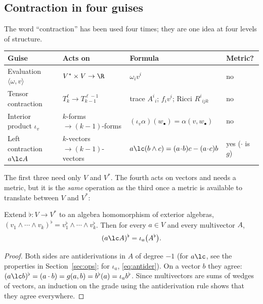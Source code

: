 \subsection{Contraction in four guises}\label{sec:contr4}

The word ``contraction'' has been used four times; they are one idea at four levels of structure.

\begin{center}
\small
\renewcommand{\arraystretch}{1.35}
\begin{tabular}{@{}p{3.4cm}p{3.5cm}p{4.2cm}p{2.2cm}@{}}
\toprule
\textbf{Guise} & \textbf{Acts on} & \textbf{Formula} & \textbf{Metric?}\\
\midrule
Evaluation $\langle\omega,v\rangle$ & $V^*\times V\to\R$ & $\omega_iv^i$ & no\\
Tensor contraction & $T^{\ell}_{k}\to T^{\ell-1}_{k-1}$ & trace $A^i{}_i$; $f_iv^i$; Ricci $R^i{}_{ijk}$ & no\\
Interior product $\iota_v$ & $k$-forms $\to(k-1)$-forms & $(\iota_v\alpha)(w_\bullet)=\alpha(v,w_\bullet)$ & no\\
Left contraction $a\lc A$ & $k$-vectors $\to(k-1)$-vectors & $a\lc(b\wedge c)=(a\!\cdot\! b)c-(a\!\cdot\! c)b$ & yes ($\cdot$ is $g$)\\
\bottomrule
\end{tabular}
\end{center}

The first three need only $V$ and $V^*$. The fourth acts on vectors and needs a metric, but it is the \emph{same} operation as the third once a
metric is available to translate between $V$ and $V^*$:

\begin{proposition}[left contraction $=$ interior product under $\flat$]\label{prop:lcisiota}
Extend $\flat:V\to V^*$ to an algebra homomorphism of exterior algebras, $(v_1\wedge\cdots\wedge v_k)^\flat=v_1^\flat\wedge\cdots\wedge v_k^\flat$. Then for every $a\in V$
and every multivector $A$,
\[
(a\lc A)^\flat=\iota_a\bigl(A^\flat\bigr).
\]
\end{proposition}
\begin{proof}
Both sides are antiderivations in $A$ of degree $-1$ (for $a\lc$, see the properties in Section~\ref{sec:ops}; for $\iota_a$, \eqref{eq:antider}). On a vector $b$ they agree:
$(a\lc b)^\flat=(a\cdot b)=g(a,b)=b^\flat(a)=\iota_a b^\flat$. Since multivectors are sums of wedges of vectors, an induction on the grade using the antiderivation rule shows that they agree everywhere.
\end{proof}

